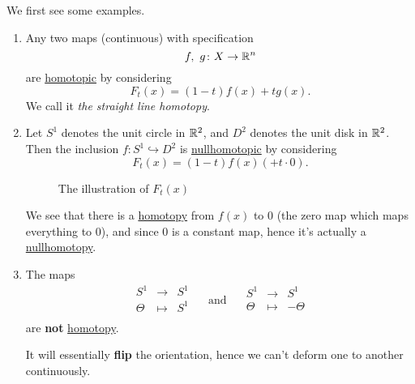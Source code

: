 \begin{eg}
	We first see some examples.
	\begin{enumerate}
		\item \label{eg:lec1:straight-line-homotopy} Any two maps (continuous) with specification
		      \[
			      f,\ g\colon X\to \mathbb{\MakeUppercase{R}}^n
		      \]
		      are \hyperref[def:homotopic]{homotopic} by considering
		      \[
			      F_{t}(x) = (1 - t)f(x) + t g(x).
		      \]
		      We call it \emph{the straight line homotopy}.
		\item Let \(S^1\) denotes the unit circle in \(\mathbb{\MakeUppercase{R}} ^2\), and
		      \(D^2\)  denotes the unit disk in \(\mathbb{\MakeUppercase{R}} ^2\). Then the inclusion
		      \(f\colon S^1\hookrightarrow D^2\) is \hyperref[def:nullhomotopic]{nullhomotopic} by considering
		      \[
			      F_t(x) = (1 - t)f(x) ( + t\cdot 0).
		      \]
		      \begin{figure}[H]
			      \centering
			      \caption{The illustration of \(F_{t}(x)\)}
			      \label{fig:eg:homotopy}
		      \end{figure}
		      We see that there is a \hyperref[def:homotopy]{homotopy} from \(f(x)\) to \(0\) (the zero
		      map which maps everything to \(0\)), and since \(0\) is a constant map, hence it's actually
		      a \hyperref[def:nullhomotopic]{nullhomotopy}.
		\item The maps
		      \[
			      \begin{array}{ccc}
				      S^1    & \to     & S^1 \\
				      \Theta & \mapsto & S^1 \\
			      \end{array}\quad \text{ and } \quad
			      \begin{array}{ccc}
				      S^1    & \to     & S^1     \\
				      \Theta & \mapsto & -\Theta \\
			      \end{array}
		      \]
		      are \textbf{not} \hyperref[def:homotopy]{homotopy}.
		      \begin{remark}
			      It will essentially \textbf{flip} the orientation, hence we can't deform one to another continuously.
		      \end{remark}
	\end{enumerate}
\end{eg}

